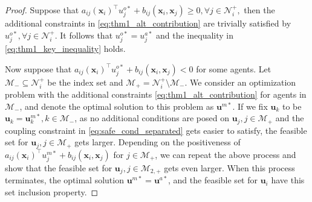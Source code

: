 \documentclass[10pt,a4paper]{amsart}
\begin{document}
\begin{proof}
    
    Suppose that $a_{ij}(\mathbf{x}_i)^\top u_j^{o*} + b_{ij}(\mathbf{x}_i,\mathbf{x}_j)  \geq 0, \forall j \in  \mathcal{N}_i^+, $ then the additional constraints in \eqref{eq:thm1_alt_contribution} are trivially satisfied by $u_j^{o*}, \forall j \in  \mathcal{N}_i^+$. It follows that $ u_j^{o*} =  u_j^{a*}$ and the inequality in \eqref{eq:thm1_key_inequality} holds. 

    Now suppose that $a_{ij}(\mathbf{x}_i)^\top u_j^{o*} + b_{ij}(\mathbf{x}_i,\mathbf{x}_j)  <  0$ for some  agents. Let $\mathcal{M}_{-}\subseteq  \mathcal{N}_i^+$ be the index set and $\mathcal{M}_{+} = \mathcal{N}_i^+ \setminus \mathcal{M}_{-} $. We consider an optimization problem with the additional constraints \eqref{eq:thm1_alt_contribution} for agents in  $\mathcal{M}_{-}$, and denote the optimal solution to this problem as $\mathbf{u}^{m*}$. If we fix $\mathbf{u}_k$ to be $ \mathbf{u}_k= \mathbf{u}_k^{m*}, k \in \mathcal{M}_{-}$, as no additional conditions are posed on  $\mathbf{u}_{j}, j\in \mathcal{M}_{+}$ and the coupling constraint in \eqref{eq:safe_cond_separated} gets easier to satisfy, the feasible set for $\mathbf{u}_{j}, j\in \mathcal{M}_{+}$ gets larger. Depending on the positiveness of $a_{ij}(\mathbf{x}_i)^\top u_j^{m*} + b_{ij}(\mathbf{x}_i,\mathbf{x}_j) $ for $j\in \mathcal{M}_{+}$, we can repeat the above process and show that the feasible set for $\mathbf{u}_{j}, j\in \mathcal{M}_{2,+}$ gets even larger. When this process terminates, the optimal solution $\mathbf{u}^{m*} = \mathbf{u}^{a*}$, and the feasible set for $\mathbf{u}_{i}$ have this set inclusion property. 
\end{proof}
\end{document}
